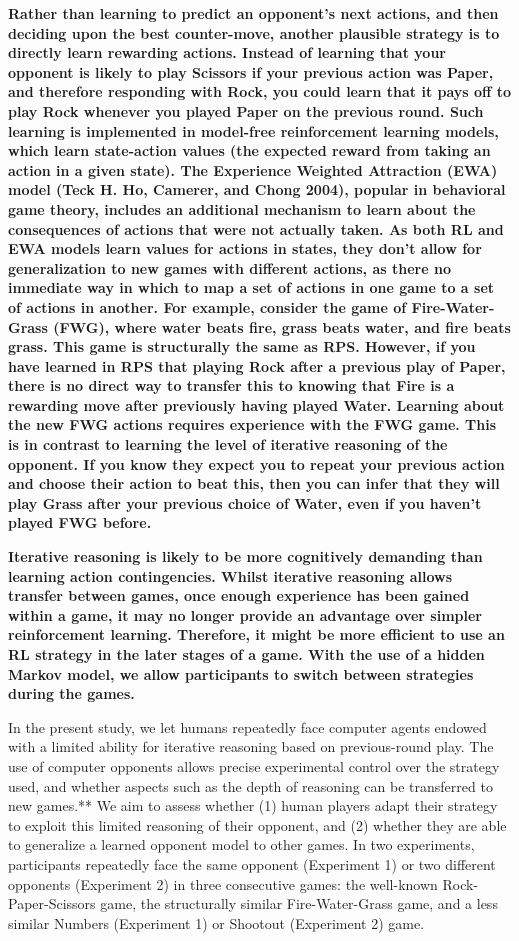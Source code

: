 \documentclass[smallextended]{svjour3}       %
\begin{document}
\textbf{Rather than learning to predict an opponent's next actions, and
then deciding upon the best counter-move, another plausible strategy is
to directly learn rewarding actions. Instead of learning that your
opponent is likely to play Scissors if your previous action was Paper,
and therefore responding with Rock, you could learn that it pays off to
play Rock whenever you played Paper on the previous round. Such learning
is implemented in model-free reinforcement learning models, which learn
state-action values (the expected reward from taking an action in a
given state). The Experience Weighted Attraction (EWA) model (Teck H.
Ho, Camerer, and Chong 2004), popular in behavioral game theory,
includes an additional mechanism to learn about the consequences of
actions that were not actually taken. As both RL and EWA models learn
values for actions in states, they don't allow for generalization to new
games with different actions, as there no immediate way in which to map
a set of actions in one game to a set of actions in another. For
example, consider the game of Fire-Water-Grass (FWG), where water beats
fire, grass beats water, and fire beats grass. This game is structurally
the same as RPS. However, if you have learned in RPS that playing Rock
after a previous play of Paper, there is no direct way to transfer this
to knowing that Fire is a rewarding move after previously having played
Water. Learning about the new FWG actions requires experience with the
FWG game. This is in contrast to learning the level of iterative
reasoning of the opponent. If you know they expect you to repeat your
previous action and choose their action to beat this, then you can infer
that they will play Grass after your previous choice of Water, even if
you haven't played FWG before.}

\textbf{Iterative reasoning is likely to be more cognitively demanding
than learning action contingencies. Whilst iterative reasoning allows
transfer between games, once enough experience has been gained within a
game, it may no longer provide an advantage over simpler reinforcement
learning. Therefore, it might be more efficient to use an RL strategy in
the later stages of a game. With the use of a hidden Markov model, we
allow participants to switch between strategies during the games.}

In the present study, we let humans repeatedly face computer agents
endowed with a limited ability for iterative reasoning based on
previous-round play. The use of computer opponents allows precise
experimental control over the strategy used, and whether aspects such as
the depth of reasoning can be transferred to new games.** We aim to
assess whether (1) human players adapt their strategy to exploit this
limited reasoning of their opponent, and (2) whether they are able to
generalize a learned opponent model to other games. In two experiments,
participants repeatedly face the same opponent (Experiment 1) or two
different opponents (Experiment 2) in three consecutive games: the
well-known Rock-Paper-Scissors game, the structurally similar
Fire-Water-Grass game, and a less similar Numbers (Experiment 1) or
Shootout (Experiment 2) game.
\end{document}
